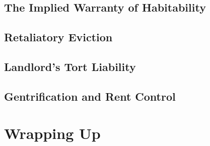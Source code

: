 


\begin{questions}

\end{questions}



\subsection{The Implied Warranty of Habitability}





\begin{questions}

\end{questions}

\begin{questions}[Problem]

\end{questions}


\subsection{Retaliatory Eviction}




\begin{questions}

\end{questions}



\subsection{Landlord's Tort Liability}



\subsection{Gentrification and Rent Control}



\begin{questions}

\end{questions}



\section{Wrapping Up}


